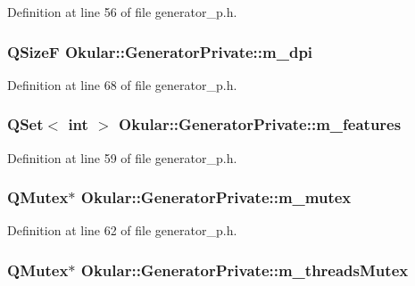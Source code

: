 Definition at line 56 of file generator\+\_\+p.\+h.

\hypertarget{classOkular_1_1GeneratorPrivate_a732d60f4510326e5ec086eceef9ef828}{
\subsubsection[{m\+\_\+dpi}]{\setlength{\rightskip}{0pt plus 5cm}Q\+Size\+F Okular\+::\+Generator\+Private\+::m\+\_\+dpi}}\label{classOkular_1_1GeneratorPrivate_a732d60f4510326e5ec086eceef9ef828}


Definition at line 68 of file generator\+\_\+p.\+h.

\hypertarget{classOkular_1_1GeneratorPrivate_a22cf6f9bf82b109180f9a2c848c9339f}{
\subsubsection[{m\+\_\+features}]{\setlength{\rightskip}{0pt plus 5cm}Q\+Set$<$ int $>$ Okular\+::\+Generator\+Private\+::m\+\_\+features}}\label{classOkular_1_1GeneratorPrivate_a22cf6f9bf82b109180f9a2c848c9339f}


Definition at line 59 of file generator\+\_\+p.\+h.

\hypertarget{classOkular_1_1GeneratorPrivate_aea7467a2404ce0dc1a3b3ffd9303fa03}{
\subsubsection[{m\+\_\+mutex}]{\setlength{\rightskip}{0pt plus 5cm}Q\+Mutex$\ast$ Okular\+::\+Generator\+Private\+::m\+\_\+mutex\hspace{0.3cm}{\ttfamily [mutable]}}}\label{classOkular_1_1GeneratorPrivate_aea7467a2404ce0dc1a3b3ffd9303fa03}


Definition at line 62 of file generator\+\_\+p.\+h.

\hypertarget{classOkular_1_1GeneratorPrivate_ae7b9db42a3b44647ae1e6e4d44a57d63}{
\subsubsection[{m\+\_\+threads\+Mutex}]{\setlength{\rightskip}{0pt plus 5cm}Q\+Mutex$\ast$ Okular\+::\+Generator\+Private\+::m\+\_\+threads\+Mutex}}\label{classOkular_1_1GeneratorPrivate_ae7b9db42a3b44647ae1e6e4d44a57d63}


